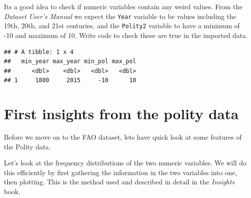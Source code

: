 \documentclass[]{book}
\newenvironment{Shaded}{\begin{snugshade}}{\end{snugshade}}
\newcommand{\DataTypeTok}[1]{\textcolor[rgb]{0.13,0.29,0.53}{#1}}
\newcommand{\DecValTok}[1]{\textcolor[rgb]{0.00,0.00,0.81}{#1}}
\newcommand{\KeywordTok}[1]{\textcolor[rgb]{0.13,0.29,0.53}{\textbf{#1}}}
\newcommand{\NormalTok}[1]{#1}
\newcommand{\OperatorTok}[1]{\textcolor[rgb]{0.81,0.36,0.00}{\textbf{#1}}}
\newcommand{\StringTok}[1]{\textcolor[rgb]{0.31,0.60,0.02}{#1}}
\begin{document}
Its a good idea to check if numeric variables contain any weird values. From the \emph{Dataset User's Manual} we expect the \texttt{Year} variable to be values including the 19th, 20th, and 21st centuries, and the \texttt{Polity2} variable to have a minimum of -10 and maximum of 10. Write code to check these are true in the imported data.

\begin{Shaded}
\end{Shaded}

\begin{verbatim}
## # A tibble: 1 x 4
##   min_year max_year min_pol max_pol
##      <dbl>    <dbl>   <dbl>   <dbl>
## 1     1800     2015     -10      10
\end{verbatim}

\hypertarget{first-insights-from-the-polity-data}{%
\section{First insights from the polity data}\label{first-insights-from-the-polity-data}}

Before we move on to the FAO dataset, lets have quick look at some features of the Polity data.

Let's look at the frequency distributions of the two numeric variables. We will do this efficiently by first gathering the information in the two variables into one, then plotting. This is the method used and described in detail in the \emph{Insights} book.

\begin{Shaded}
\end{Shaded}
\end{document}
